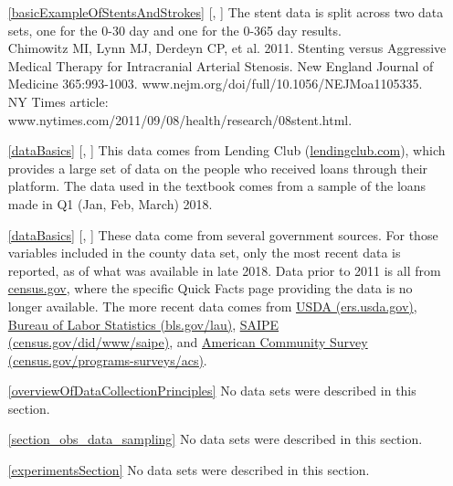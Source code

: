 \begin{itemize}
\item[\ref{basicExampleOfStentsAndStrokes}]
    [\datalink{stent30}, \datalink{stent365}]
    The stent data is split across two data sets,
    one for the 0-30 day and one for the 0-365 day results. \\
    Chimowitz MI, Lynn MJ, Derdeyn CP, et al. 2011.
    Stenting versus Aggressive Medical Therapy for
    Intracranial Arterial Stenosis.
    New England Journal of Medicine 365:993-1003.
        {www.nejm.org/doi/full/10.1056/NEJMoa1105335}. \\
    NY Times article:
        {www.nytimes.com/2011/09/08/health/research/08stent.html}.

\item[\ref{dataBasics}]
    [\datalink{loan50}, \datalink{loans\_full\_schema}]
    This data comes from Lending Club
    (\href{https://www.lendingclub.com/info/download-data.action}
        {lendingclub.com}),
    which provides a large set of data on the people who
    received loans through their platform.
    The data used in the textbook comes from a sample
    of the loans made in Q1 (Jan, Feb, March) 2018.
\item[\ref{dataBasics}]
    [\datalink{county}, \datalink{county\_complete}]
    These data come from several government sources.
    For those variables included in the
    county data set, only the most recent data is reported,
    as of what was available in late 2018.
    Data prior to 2011 is all from
    \href{http://census.gov}{census.gov},
    where the specific Quick Facts page providing the data
    is no longer available.
    The more recent data comes from
    \href{https://www.ers.usda.gov/data-products/county-level-data-sets/download-data/}
        {USDA (ers.usda.gov)},
    \href{https://www.bls.gov/lau/}
        {Bureau of Labor Statistics (bls.gov/lau)},
    \href{https://www.census.gov/did/www/saipe/}
        {SAIPE (census.gov/did/www/saipe)},
    and
    \href{https://www.census.gov/programs-surveys/acs/}
        {American Community Survey
            (census.gov/programs-surveys/acs)}.

\item[\ref{overviewOfDataCollectionPrinciples}]
    No data sets were described in this section.

\item[\ref{section_obs_data_sampling}]
    No data sets were described in this section.

\item[\ref{experimentsSection}]
    No data sets were described in this section.
\end{itemize}






